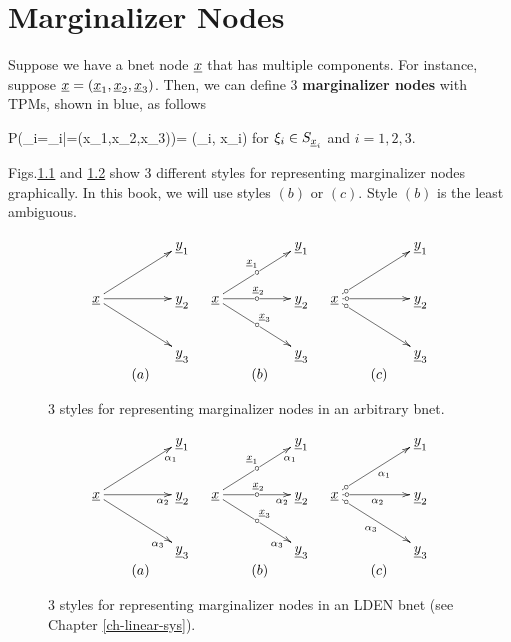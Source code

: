 \chapter{Marginalizer Nodes}
\label{ch-marginalizer}

Suppose we have a bnet node ${\underline{x}}$
that has multiple components.
For instance, suppose
${\underline{x}}=({\underline{x}}_1, {\underline{x}}_2, {\underline{x}}_3)$.
Then, we can define 
3 {\bf marginalizer nodes}
with TPMs, shown in blue, as follows

\beq\color{blue}
P(\rvx_i=\xi_i|\rvx=(x_1,x_2,x_3))= \delta(\xi_i, x_i)
\eeq
for $\xi_i\in S_{{\underline{x}}_i}$
and $i=1,2,3$.

Figs.\ref{fig-marginalizer}
and \ref{fig-marginalizer-lden}
show 3 different
styles for representing
marginalizer nodes graphically.
In this book,
we will use styles $(b)$ or $(c)$.
Style $(b)$ is the least 
ambiguous.

\begin{figure}[h!]
$$
\begin{array}{ccc}
\xymatrix@C=4pc{
&\rvy_1
\\
\rvx\ar[ru]
\ar[r]
\ar[rd]
&\rvy_2
\\
&\rvy_3
}
&
\xymatrix@C=4pc{
&\rvy_1
\\
\rvx\ar[ru]|-\circ^{\rvx_1}
\ar[r]|-\circ^{\rvx_2}
\ar[rd]|-\circ^{\rvx_3}
&\rvy_2
\\
&\rvy_3
}
&
\xymatrix@C=4pc{
&\rvy_1
\\
\rvx\ar[ru]|-<\circ
\ar[r]|-<\circ
\ar[rd]|-<\circ
&\rvy_2
\\
&\rvy_3
}
\\
(a)&(b)&(c)
\end{array}
$$
\caption{3 styles
for representing marginalizer nodes
in an arbitrary bnet.}
\label{fig-marginalizer}
\end{figure}


\begin{figure}[h!]
$$
\begin{array}{ccc}
\xymatrix@C=4pc{
&\rvy_1
\\
\rvx\ar[ru]_>>>{\alpha_1}
\ar[r]_>>>{\alpha_2}
\ar[rd]_>>>{\alpha_3}
&\rvy_2
\\
&\rvy_3
}
&
\xymatrix@C=4pc{
&\rvy_1
\\
\rvx\ar[ru]_>>>{\alpha_1}|-\circ^{\rvx_1}
\ar[r]_>>>{\alpha_2}|-\circ^{\rvx_2}
\ar[rd]_>>>{\alpha_3}|-\circ^{\rvx_3}
&\rvy_2
\\
&\rvy_3
}
&
\xymatrix@C=4pc{
&\rvy_1
\\
\rvx\ar[ru]_{\alpha_1}|-<\circ
\ar[r]_{\alpha_2}|-<\circ
\ar[rd]_{\alpha_3}|-<\circ
&\rvy_2
\\
&\rvy_3
}
\\
(a)&(b)&(c)
\end{array}
$$
\caption{3 styles
for representing marginalizer nodes
in an LDEN bnet (see Chapter \ref{ch-linear-sys}).}
\label{fig-marginalizer-lden}
\end{figure}

